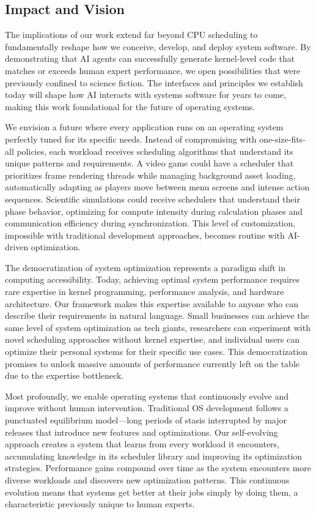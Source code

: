 \subsection{Impact and Vision}

The implications of our work extend far beyond CPU scheduling to fundamentally reshape how we conceive, develop, and deploy system software. By demonstrating that AI agents can successfully generate kernel-level code that matches or exceeds human expert performance, we open possibilities that were previously confined to science fiction. The interfaces and principles we establish today will shape how AI interacts with systems software for years to come, making this work foundational for the future of operating systems.

We envision a future where every application runs on an operating system perfectly tuned for its specific needs. Instead of compromising with one-size-fits-all policies, each workload receives scheduling algorithms that understand its unique patterns and requirements. A video game could have a scheduler that prioritizes frame rendering threads while managing background asset loading, automatically adapting as players move between menu screens and intense action sequences. Scientific simulations could receive schedulers that understand their phase behavior, optimizing for compute intensity during calculation phases and communication efficiency during synchronization. This level of customization, impossible with traditional development approaches, becomes routine with AI-driven optimization.

The democratization of system optimization represents a paradigm shift in computing accessibility. Today, achieving optimal system performance requires rare expertise in kernel programming, performance analysis, and hardware architecture. Our framework makes this expertise available to anyone who can describe their requirements in natural language. Small businesses can achieve the same level of system optimization as tech giants, researchers can experiment with novel scheduling approaches without kernel expertise, and individual users can optimize their personal systems for their specific use cases. This democratization promises to unlock massive amounts of performance currently left on the table due to the expertise bottleneck.

Most profoundly, we enable operating systems that continuously evolve and improve without human intervention. Traditional OS development follows a punctuated equilibrium model—long periods of stasis interrupted by major releases that introduce new features and optimizations. Our self-evolving approach creates a system that learns from every workload it encounters, accumulating knowledge in its scheduler library and improving its optimization strategies. Performance gains compound over time as the system encounters more diverse workloads and discovers new optimization patterns. This continuous evolution means that systems get better at their jobs simply by doing them, a characteristic previously unique to human experts.

